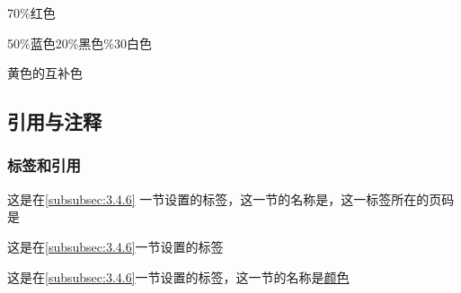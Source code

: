 \documentclass[twoside]{ctexart} %
\begin{document}
            {\color{green}{绿色}}

            {\color{olive}{橄榄色}}

            {\color{red}{红色}}

            {\color{yellow}{黄色}}

            {\color{cyan}{青色}}

            {\color{lightgray}{浅灰色}}

            {\color{orange}{橙色}}

            {\color{teal}{鸭绿色}}

            {\textcolor{red!70}{70\%红色}}

            {\textcolor{blue!50!black!20!white}{50\%蓝色20\%黑色\%30白色}}

            {\textcolor{-yellow}{黄色的互补色}}

    \subsection{引用与注释}
        \subsubsection{标签和引用}
            这是在\ref{subsubsec:3.4.6} 一节设置的标签，这一节的名称是，这一标签所在的页码是\pageref{subsubsec:3.4.6}
            
        这是在\eqref{subsubsec:3.4.6}一节设置的标签
        
            这是在\autoref{subsubsec:3.4.6}一节设置的标签，这一节的名称是\hyperref[subsubsec:3.4.6]{颜色}
\end{document}
